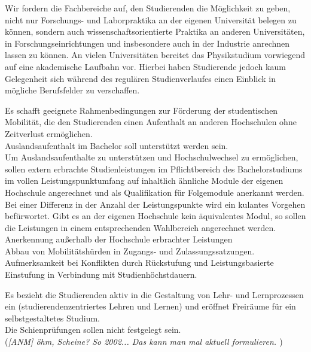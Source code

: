 \documentclass[a4paper]{scrartcl}
\begin{document}
\textcolor{Bernd}{\textbf{\cite{RESO: WiSe2017-BPrak}} Wir fordern die Fachbereiche auf, den Studierenden die Möglichkeit zu geben, nicht nur Forschungs- und Laborpraktika an der eigenen Universität belegen zu können, sondern auch wissenschaftsorientierte Praktika an anderen Universitäten, in Forschungseinrichtungen und insbesondere auch in der Industrie anrechnen lassen zu können. An vielen Universitäten bereitet das Physikstudium vorwiegend auf eine akademische Laufbahn vor. Hierbei haben Studierende jedoch kaum Gelegenheit sich während des regulären Studienverlaufes einen Einblick in mögliche Berufsfelder zu verschaffen.}

Es schafft geeignete Rahmenbedingungen zur Förderung der studentischen Mobilität, die den Studierenden einen Aufenthalt an anderen Hochschulen ohne Zeitverlust ermöglichen.\\

\textcolor{Bernd}{\textbf{\cite{RESO: SoSe2010-BaMa}} Auslandsaufenthalt im Bachelor soll unterstützt werden sein.\\ Um Auslandsaufenthalte zu unterstützen und Hochschulwechsel zu ermöglichen, sollen extern erbrachte Studienleistungen im Pflichtbereich des Bachelorstudiums im vollen Leistungspunktumfang auf inhaltlich ähnliche Module der eigenen Hochschule angerechnet und als Qualifikation für Folgemodule anerkannt werden. Bei einer Differenz in der Anzahl der Leistungspunkte wird ein kulantes Vorgehen befürwortet. Gibt es an der eigenen Hochschule kein äquivalentes Modul, so sollen die Leistungen in einem entsprechenden Wahlbereich angerechnet werden.}\\

\textcolor{Bernd}{\textbf{\cite{PROT: WiSe2015-RL}} Anerkennung außerhalb der Hochschule erbrachter Leistungen}\\

\textcolor{Bernd}{\textbf{\cite{RESO: SoSe2018-Mob}} Abbau von Mobilitätshürden in Zugangs- und Zulassungssatzungen. Aufmerksamkeit bei Konflikten durch Rückstufung und Leistungsbasierte Einstufung in Verbindung mit Studienhöchstdauern.}
\label{todo:BisHierhinLinksKontrolliert}

Es bezieht die Studierenden aktiv in die Gestaltung von Lehr- und Lernprozessen ein (studierendenzentriertes Lehren und Lernen) und eröffnet Freiräume für ein selbstgestaltetes Studium.\\

\textcolor{Bernd}{\textbf{\cite{RESO: SoSe2002-RL}} Die Schienprüfungen sollen nicht festgelegt sein. }\\ (\emph{\textcolor{Brutus}{[ANM] öhm, Scheine? So 2002... Das kann man mal aktuell formulieren. }})\\
\end{document}
